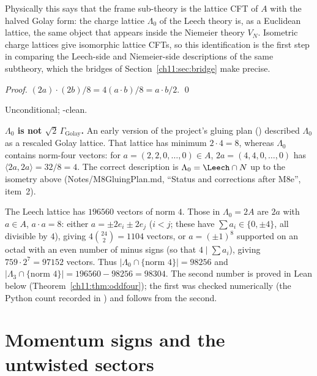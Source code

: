 \begin{physics}
Physically this says that the frame sub-theory is the lattice CFT of $A$ with the halved Golay form: the charge lattice $\Lambda_0$ of the Leech theory is, as a Euclidean lattice, the same object that appears inside the Niemeier theory $V_N$. Isometric charge lattices give isomorphic lattice CFTs, so this identification is the first step in comparing the Leech-side and Niemeier-side descriptions of the same subtheory, which the bridges of Section~\ref{ch11:sec:bridge} make precise.
\end{physics}
\emph{Proof.}  $(2a)\cdot(2b)/8=4(a\cdot b)/8=a\cdot b/2$. \qed
\begin{status}
Unconditional; -clean.
\end{status}

\begin{warning}
\textbf{$\Lambda_0$ is not $\sqrt2\,\Gamma_{\mathrm{Golay}}$.}  An early version of the project's gluing plan ()
described $\Lambda_0$ as a rescaled Golay lattice.  That lattice has minimum $2\cdot4=8$, whereas
$\Lambda_0$ contains norm-four vectors: for $a=(2,2,0,\dots,0)\in A$, $2a=(4,4,0,\dots,0)$ has
$\langle 2a,2a\rangle=32/8=4$.  The correct description is $\Lambda_0=\Leech\cap\chelN$ up to the
isometry above (Notes/M8GluingPlan.md, ``Status and corrections after M8e'', item~2).
\end{warning}

\begin{example}\label{ch11:ex:normfour}
The Leech lattice has $196560$ vectors of norm $4$.  Those in $\Lambda_0=2A$ are $2a$ with
$a\in A$, $a\cdot a=8$: either $a=\pm2e_i\pm2e_j$ ($i<j$; these have $\sum a_i\in\{0,\pm4\}$, all
divisible by $4$), giving $4\binom{24}{2}=1104$ vectors, or $a=(\pm1)^8$ supported on an octad with
an even number of minus signs (so that $4\mid\sum a_i$), giving $759\cdot2^7=97152$ vectors.  Thus
$|\Lambda_0\cap\{\text{norm }4\}|=98256$ and $|\Lambda_3\cap\{\text{norm }4\}|=196560-98256=98304$.
The second number is proved in Lean below (Theorem~\ref{ch11:thm:oddfour}); the first was checked
numerically (the Python count recorded in ) and follows from the second.
\end{example}

\section{Momentum signs and the untwisted sectors}\label{ch11:sec:sectors}

